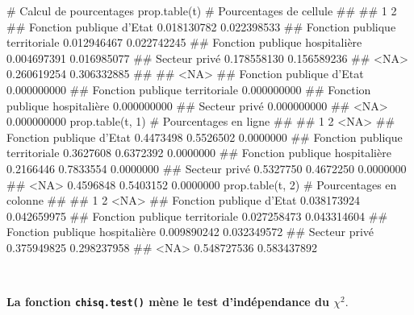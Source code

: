 \documentclass[12pt,twosided, notitlepage]{book}
\newenvironment{Shaded}{}{}
\newcommand{\KeywordTok}[1]{\textcolor[rgb]{0.00,0.00,1.00}{{#1}}}
\newcommand{\DecValTok}[1]{{#1}}
\newcommand{\CommentTok}[1]{\textcolor[rgb]{0.00,0.50,0.00}{{#1}}}
\newcommand{\NormalTok}[1]{{#1}}
\renewenvironment{Shaded}{\begin{snugshade}}{\end{snugshade}}
\begin{document}
\begin{Shaded}
\begin{Highlighting}[]
\CommentTok{# Calcul de pourcentages}
\KeywordTok{prop.table}\NormalTok{(t) }\CommentTok{# Pourcentages de cellule}
  \NormalTok{##                                 }
  \NormalTok{##                                            1           2}
  \NormalTok{##   Fonction publique d'Etat       0.018130782 0.022398533}
  \NormalTok{##   Fonction publique territoriale 0.012946467 0.022742245}
  \NormalTok{##   Fonction publique hospitalière 0.004697391 0.016985077}
  \NormalTok{##   Secteur privé                  0.178558130 0.156589236}
  \NormalTok{##   <NA>                           0.260619254 0.306332885}
  \NormalTok{##                                 }
  \NormalTok{##                                         <NA>}
  \NormalTok{##   Fonction publique d'Etat       0.000000000}
  \NormalTok{##   Fonction publique territoriale 0.000000000}
  \NormalTok{##   Fonction publique hospitalière 0.000000000}
  \NormalTok{##   Secteur privé                  0.000000000}
  \NormalTok{##   <NA>                           0.000000000}
\KeywordTok{prop.table}\NormalTok{(t, }\DecValTok{1}\NormalTok{) }\CommentTok{# Pourcentages en ligne}
  \NormalTok{##                                 }
  \NormalTok{##                                          1         2      <NA>}
  \NormalTok{##   Fonction publique d'Etat       0.4473498 0.5526502 0.0000000}
  \NormalTok{##   Fonction publique territoriale 0.3627608 0.6372392 0.0000000}
  \NormalTok{##   Fonction publique hospitalière 0.2166446 0.7833554 0.0000000}
  \NormalTok{##   Secteur privé                  0.5327750 0.4672250 0.0000000}
  \NormalTok{##   <NA>                           0.4596848 0.5403152 0.0000000}
\KeywordTok{prop.table}\NormalTok{(t, }\DecValTok{2}\NormalTok{) }\CommentTok{# Pourcentages en colonne}
  \NormalTok{##                                 }
  \NormalTok{##                                            1           2 <NA>}
  \NormalTok{##   Fonction publique d'Etat       0.038173924 0.042659975     }
  \NormalTok{##   Fonction publique territoriale 0.027258473 0.043314604     }
  \NormalTok{##   Fonction publique hospitalière 0.009890242 0.032349572     }
  \NormalTok{##   Secteur privé                  0.375949825 0.298237958     }
  \NormalTok{##   <NA>                           0.548727536 0.583437892}
\end{Highlighting}
\end{Shaded}

~

\textbf{La fonction \texttt{chisq.test()} mène le test d'indépendance du
\(\chi^2\)}.
\end{document}
